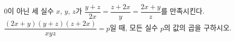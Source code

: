 $0$이 아닌 세 실수 $x$, $y$, $z$가 $\dfrac{y+z}{2x}=\dfrac{z+2x}{y}=\dfrac{2x+y}{z}$를 만족시킨다. $\dfrac{(2x+y)(y+z)(z+2x)}{xyz}=p$일 때, 모든 실수 $p$의 값의 곱을 구하시오.

